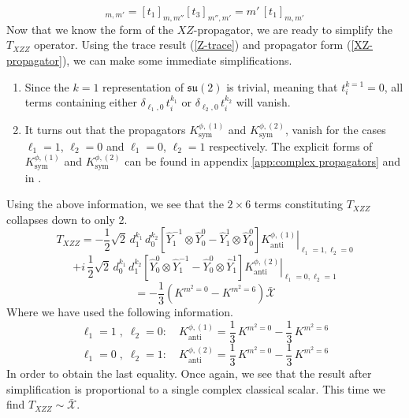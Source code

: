 %
%
\begin{equation}
[t_1 t_3]_{m,m'} = [t_1]_{m,m''} [t_3]_{m'',m'} = m' \, [t_1]_{m,m'}
\end{equation}
%
%
Now that we know the form of the $XZ$-propagator, we are ready to simplify the $T_{XZZ}$ operator. Using the trace result (\ref{Z-trace}) and propagator form (\ref{XZ-propagator}), we can make some immediate simplifications.
%
%
\begin{enumerate}
%
\item Since the $k=1$ representation of $\mathfrak{su}(2)$ is trivial, meaning that $t^{k=1}_i = 0$, all terms containing either $\delta_{\ell_1,0} \, t_i^{k_1}$ or $\delta_{\ell_2,0} \, t_i^{k_2}$ will vanish.
%
\item It turns out that the propagators $K^{\phi,(1)}_{\text{sym}}$ and $K^{\phi,(2)}_{\text{sym}}$, vanish for the cases $\ell_1=1$, $\ell_2=0$ and $\ell_1=0$, $\ell_2=1$ respectively. The explicit forms of $K^{\phi,(1)}_{\text{sym}}$ and $K^{\phi,(2)}_{\text{sym}}$ can be found in appendix \ref{app:complex propagators} and in \cite{One-point functions in D3-D7}.
%
\end{enumerate}
%
%
Using the above information, we see that the $2 \times 6$ terms constituting $T_{XZZ}$ collapses down to only 2. 
%
%
\begin{equation*}
T_{XZZ}
=
-\frac{1}{2} \sqrt{2} \, d_1^{k_1} \, d_0^{k_2} \left[
\hat{Y}^{-1}_{1} \otimes \hat{Y}^{0}_{0}
-
\hat{Y}^{1}_{1} \otimes \hat{Y}^{0}_{0}
\right]
\left. K^{\phi,(1)}_{\text{anti}} \right|_{\ell_1=1,\ell_2=0}
\end{equation*}
%
%
\begin{equation*}
+ i \, \frac{1}{2} \sqrt{2} \, d_0^{k_1} \, d_1^{k_2}\left[
\hat{Y}^{0}_{0} \otimes \hat{Y}^{-1}_{1}
-
\hat{Y}^{0}_{0} \otimes \hat{Y}^{1}_{1}
\right]
\left. K^{\phi,(2)}_{\text{anti}} \right|_{\ell_1=0,\ell_2=1}
\end{equation*}
%
%
\begin{equation}
=
-\frac{1}{3} \left(
K^{m^2=0} - K^{m^2=6}
\right)
\bar{\mathcal{X}}
\end{equation}
%
%
Where we have used the following information.
%
%
\begin{equation}
\ell_1 = 1 \; , \; \ell_2 = 0 : \quad
%
K^{\phi,(1)}_{\mathrm{anti}}
=
\frac{1}{3} \, K^{m^2 = 0}
-
\frac{1}{3} \, K^{m^2 = 6}
\end{equation}
%
%
\begin{equation}
\ell_1 = 0 \; , \; \ell_2 = 1 : \quad
%
K^{\phi,(2)}_{\mathrm{anti}}
=
\frac{1}{3} \, K^{m^2 = 0}
-
\frac{1}{3} \, K^{m^2 = 6}
\end{equation}
%
%
In order to obtain the last equality. Once again, we see that the result after simplification is proportional to a single complex classical scalar. This time we find $T_{XZZ} \sim \mathcal{\bar{X}}$.

